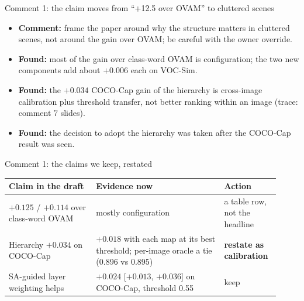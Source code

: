 
\begin{frame}{Comment 1: the claim moves from ``+12.5 over OVAM'' to cluttered scenes}
\begin{itemize}
\item \textbf{Comment:} frame the paper around why the structure matters in cluttered scenes, not around the gain over OVAM; be careful with the owner override.
\item \textbf{Found:} most of the gain over class-word OVAM is configuration; the two new components add about $+0.006$ each on VOC-Sim.
\item \textbf{Found:} the $+0.034$ COCO-Cap gain of the hierarchy is cross-image calibration plus threshold transfer, not better ranking within an image (trace: comment 7 slides).
\item \textbf{Found:} the decision to adopt the hierarchy was taken after the COCO-Cap result was seen.
\end{itemize}
\end{frame}

\begin{frame}{Comment 1: the claims we keep, restated}
\begin{slidetable}
\begin{tabular}{@{}>{\raggedright\arraybackslash}p{0.30\linewidth}>{\raggedright\arraybackslash}p{0.44\linewidth}>{\raggedright\arraybackslash}p{0.18\linewidth}@{}}
\toprule
Claim in the draft & Evidence now & Action \\
\midrule
$+0.125$ / $+0.114$ over class-word OVAM & mostly configuration & a table row, not the headline \\
Hierarchy $+0.034$ on COCO-Cap & $+0.018$ with each map at its best threshold; per-image oracle a tie (0.896 vs 0.895) & \textbf{restate as calibration} \\
SA-guided layer weighting helps & $+0.024$ [$+0.013$, $+0.036$] on COCO-Cap, threshold 0.55 & keep \\
\bottomrule
\end{tabular}
\end{slidetable}
\end{frame}

